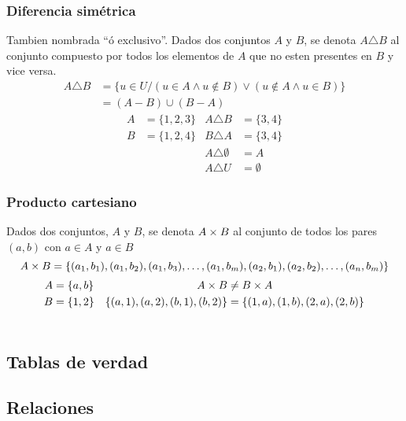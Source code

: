 \documentclass[../teoria.root.tex]{subfiles}
\begin{document}
\subsubsection{Diferencia simétrica}
Tambien nombrada ``ó exclusivo''. Dados dos conjuntos $A$ y $B$, se denota $A \triangle B$
al conjunto compuesto por todos los elementos de $A$ que no esten presentes en $B$ y vice versa.
\begin{align*}
    A \triangle B & = \{u \in U / (u \in A \land u \notin B) \lor (u \notin A \land u \in B) \} \\
                  & = (A - B) \cup (B - A)
\end{align*}
\begin{align*}
    A & = \{1, 2, 3\} & A \triangle B         & = \{3, 4\}  \\
    B & = \{1, 2, 4\} & B \triangle A         & = \{3, 4\}  \\
      &               & A \triangle \emptyset & = A         \\
      &               & A \triangle U         & = \emptyset
\end{align*}
\subsubsection{Producto cartesiano}
Dados dos conjuntos, $A$ y $B$, se denota $A \times B$ al conjunto de todos los pares $(a, b)$ con $a \in A$ y $a \in B$
\[ A \times B = \{(a_1, b_1), (a_1, b_2), (a_1, b_3), \dots, (a_1, b_m), (a_2, b_1), (a_2, b_2), \dots, (a_n, b_m)\} \]
\begin{align*}
    A & = \{a, b\} & A \times B                             & \neq B \times A                          \\
    B & = \{1, 2\} & \{(a, 1), (a, 2), (b, 1), (b, 2)\} & = \{(1, a), (1, b), (2, a), (2, b)\} \\
      &            &
\end{align*}

\subsection{Tablas de verdad}
\subsection{Relaciones}
\end{document}
